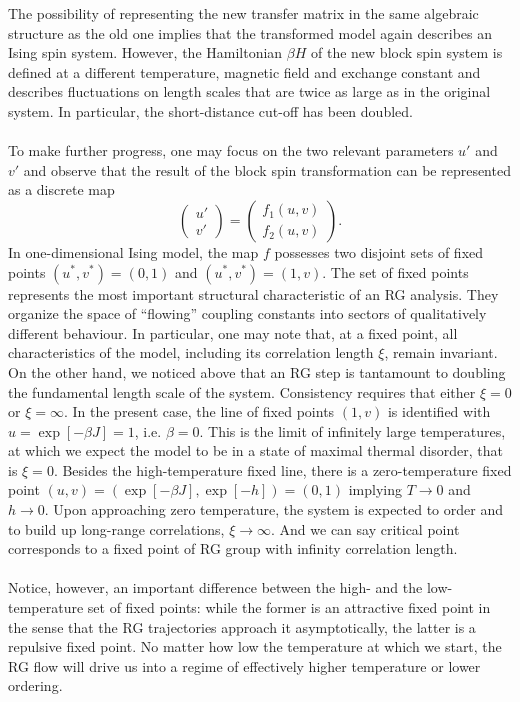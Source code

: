 The possibility of representing the new transfer matrix in the same algebraic structure as the old one implies that the transformed model again describes an Ising spin system. However, the Hamiltonian $\beta H$ of the new block spin system is defined at a different temperature, magnetic field and exchange constant and describes fluctuations on length scales that are twice as large as in the original system.
In particular, the short-distance cut-off has been doubled.
\\ \\
To make further progress, one may focus on the two relevant parameters $u'$ and $v'$ and observe that the result of the block spin transformation can be represented as a discrete map
\[\begin{pmatrix} u' \\ v' \end{pmatrix} = \begin{pmatrix}
f_1(u,v) \\ f_2(u,v)
\end{pmatrix} .\]
In one-dimensional Ising model, the map $f$ possesses two
disjoint sets of fixed points $(u^*,v^*) = (0,1)$ and $(u^*,v^*) = (1,v)$.
The set of fixed points represents the most important structural characteristic of an RG analysis. 
They organize the space of ``flowing'' coupling constants into sectors of qualitatively different behaviour. 
In particular, one may note that, at a fixed point, all characteristics of the model, including its correlation length $\xi$, remain invariant.
On the other hand, we noticed above that an RG step is tantamount to doubling the fundamental length scale of the system.
Consistency requires that either $\xi = 0$ or $\xi = \infty$. 
In the present case, the line of fixed points $(1,v)$ is identified with $u = \exp[-\beta J] = 1$, i.e. $\beta = 0$.
This is the limit of infinitely large temperatures, at which we expect the model to be in a state of maximal thermal disorder, that is $\xi = 0$.
Besides the high-temperature fixed line, there is a zero-temperature fixed point $(u, v) = (\exp[−\beta J], \exp[−h]) = (0, 1)$ implying $T \to 0$ and $h \to 0$. 
Upon approaching zero temperature, the system is expected to order and to build up long-range correlations, $\xi \to \infty$. And we can say critical point corresponds to a fixed point of RG group with infinity correlation length.
\\ \\
Notice, however, an important difference between the high- and the low-temperature set of fixed points: while the former is an attractive fixed point in the sense that the RG trajectories approach it asymptotically, the latter is a repulsive fixed point. No matter how low the temperature at which we start, the RG flow will drive us into a regime of effectively higher temperature or lower ordering. 
